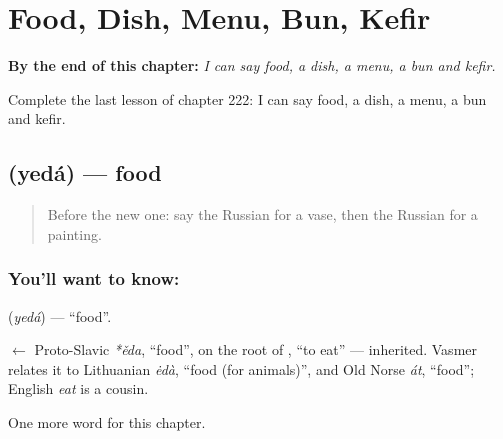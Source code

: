 
\chapter{Food, Dish, Menu, Bun, Kefir}
\label{ch:ru-food-dish-menu-bun-kefir}

\begin{chapteropening}
\textbf{By the end of this chapter:} \emph{I can say food, a dish, a menu, a bun and kefir.}

Complete the last lesson of chapter 222: I can say food, a dish, a menu, a bun and kefir.
\end{chapteropening}

\section[\texorpdfstring{\ru{еда} (yedá)}{еда (yedá)}]{ (yedá) — food}

\label{lesson:RU-C222-yeda}



\begin{quote}
Before the new one: say the Russian for a vase, then the Russian for a painting.
\end{quote}

\subsection*{You'll want to know: }
\textbf{} (\emph{yedá}) — \textquotedblleft{}food\textquotedblright{}.

\begin{cousinweb}
\textbf{} $\leftarrow$ Proto-Slavic \emph{*ěda}, \textquotedblleft{}food\textquotedblright{}, on the root of \emph{}, \textquotedblleft{}to eat\textquotedblright{} — inherited. Vasmer relates it to Lithuanian \emph{ėdà}, \textquotedblleft{}food (for animals)\textquotedblright{}, and Old Norse \emph{át}, \textquotedblleft{}food\textquotedblright{}; English \emph{eat} is a cousin.
\end{cousinweb}

\begin{grammarlens}[title={What you've built}]
One more word for this chapter.
\end{grammarlens}

